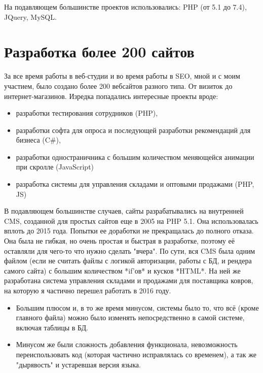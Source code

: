 \documentclass[10pt]{tpl/developercv} %
\begin{document}

\newpage
{}

На подавляющем большинстве проектов использовались: PHP (от 5.1 до 7.4), JQuery, MySQL.

\section{Разработка более 200 сайтов}

За все время работы в веб-студии и во время работы в SEO, мной и с моим участием, было создано более 200 вебсайтов разного типа. От визиток до интернет-магазинов. Изредка попадались интересные проекты вроде:
\begin{itemize}
   \item разработки тестирования сотрудников (PHP),
   \item разработки софта для опроса и последующей разработки рекомендаций для бизнеса (C\#),
   \item разработки одностраничника с большим количеством меняющейся анимации при скролле (JavaScript)
   \item разработка системы для управления складами и оптовыми продажами (PHP, JS)
\end{itemize}

В подавляющем большинстве случаев, сайты разрабатывались на внутренней CMS, созданной для простых сайтов еще в 2005 на PHP 5.1. Она использовалась вплоть до 2015 года. Попытки ее доработки не прекращалась до полного отказа. Она была не гибкая, но очень простая и быстрая в разработке, поэтому её оставляли для чего-то что нужно сделать "вчера". По сути, вся CMS была одним файлом (если не считать файлы с логикой авторизации, работы с БД, и рендера самого сайта) с большим количеством *if'ов* и кусков *HTML*. На ней же разработана система управления складами и продажами для поставщика ковров, на которую я частично перешел работать в 2016 году.

\begin{itemize}
 \item Большим плюсом и, в то же время минусом, системы было то, что всё (кроме главного файла) можно было изменять непосредственно в самой системе, включая таблицы в БД.

 \item Минусом же были сложность добавления функционала, невозможность переиспользовать код (которая частично исправлялась со временем), а так же "дырявость" и устаревшая версия языка.
\end{itemize}
\end{document}
